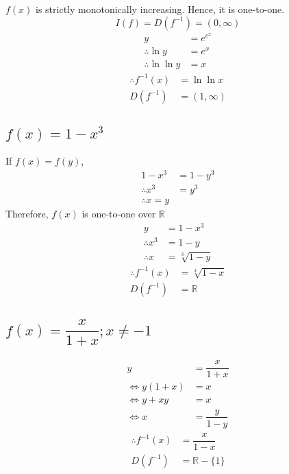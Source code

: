\documentclass[fleqn]{article}
\begin{document}
$f(x)$ is strictly monotonically increasing. Hence, it is one-to-one.
\begin{equation*}
	I(f) = D(f^{-1}) = (0,\infty)
\end{equation*}
\begin{align*}
	y &= e^{e^x}\\
	\therefore \ln y &= e^x\\
	\therefore \ln \ln y &= x
\end{align*}
\begin{align*}
	\therefore f^{-1}(x) &= \ln \ln x\\
	D(f^{-1}) &= (1, \infty)
\end{align*}
\subsection{$f(x) = 1 - x^3$}

If $f(x) = f(y)$, 
\begin{align*}
	1 - x^3 &= 1 - y^3\\
	\therefore x^3 &= y^3\\
	\therefore x = y
\end{align*}
Therefore, $f(x)$ is one-to-one over $\mathbb{R}$\\
\begin{align*}
	y &= 1 - x^3\\
	\therefore x^3 &= 1 - y\\
	\therefore x &= \sqrt[3]{1-y}
\end{align*}
\begin{align*}
	\therefore f^{-1}(x) &= \sqrt[3]{1 - x}\\
D(f^{-1}) &= \mathbb{R}
\end{align*}
\subsection{$f(x) = \dfrac{x}{1 + x}; x \neq -1$}

\begin{align*}
	y &= \dfrac{x}{1+x}\\
	\Leftrightarrow y(1 + x) &= x\\
	\Leftrightarrow y + xy &= x\\
	\Leftrightarrow x &= \dfrac{y}{1 - y}
\end{align*}
\begin{align*}
	\therefore f^{-1}(x) &= \dfrac{x}{1- x}\\
	D(f^{-1}) &= \mathbb{R} - \{1\}
\end{align*}
\end{document}

